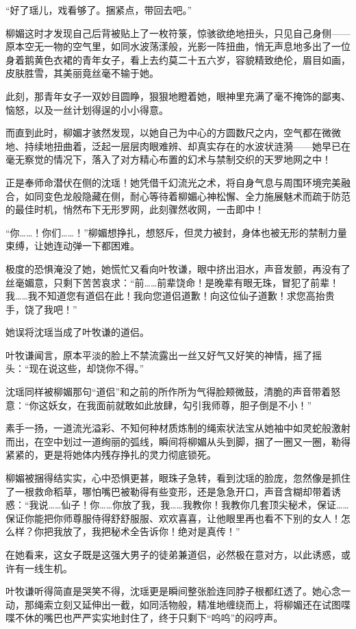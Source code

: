 “好了瑶儿，戏看够了。捆紧点，带回去吧。”

柳媚这时才发现自己后背被贴上了一枚符箓，惊骇欲绝地扭头，只见自己身侧——原本空无一物的空气里，如同水波荡漾般，光影一阵扭曲，悄无声息地多出了一位身着鹅黄色衣裙的青年女子，看上去约莫二十五六岁，容貌精致绝伦，眉目如画，皮肤胜雪，其美丽竟丝毫不输于她。

此刻，那青年女子一双妙目圆睁，狠狠地瞪着她，眼神里充满了毫不掩饰的鄙夷、恼怒，以及一丝计划得逞的小小得意。

而直到此时，柳媚才骇然发现，以她自己为中心的方圆数尺之内，空气都在微微地、持续地扭曲着，泛起一层层肉眼难辨、却真实存在的水波状涟漪——她早已在毫无察觉的情况下，落入了对方精心布置的幻术与禁制交织的天罗地网之中！

正是奉师命潜伏在侧的沈瑶！她凭借千幻流光之术，将自身气息与周围环境完美融合，如同变色龙般隐藏在侧，耐心等待着柳媚心神松懈、全力施展魅术而疏于防范的最佳时机，悄然布下无形罗网，此刻骤然收网，一击即中！

“你……！你们……！”柳媚想挣扎，想怒斥，但灵力被封，身体也被无形的禁制力量束缚，让她连动弹一下都困难。

极度的恐惧淹没了她，她慌忙又看向叶牧谦，眼中挤出泪水，声音发颤，再没有了丝毫媚意，只剩下苦苦哀求：“前……前辈饶命！是晚辈有眼无珠，冒犯了前辈！我……我不知道您有道侣在此！我向您道侣道歉！向这位仙子道歉！求您高抬贵手，饶了我吧！”

她误将沈瑶当成了叶牧谦的道侣。

叶牧谦闻言，原本平淡的脸上不禁流露出一丝又好气又好笑的神情，摇了摇头：“现在说这些，却饶你不得。”

沈瑶同样被柳媚那句“道侣”和之前的所作所为气得脸颊微鼓，清脆的声音带着怒意：“你这妖女，在我面前就敢如此放肆，勾引我师尊，胆子倒是不小！”

素手一扬，一道流光溢彩、不知何种材质炼制的绳索状法宝从她袖中如灵蛇般激射而出，在空中划过一道绚丽的弧线，瞬间将柳媚从头到脚，捆了一圈又一圈，勒得紧紧的，更是将她体内残存挣扎的灵力彻底锁死。

柳媚被捆得结实实，心中恐惧更甚，眼珠子急转，看到沈瑶的脸庞，忽然像是抓住了一根救命稻草，哪怕嘴巴被勒得有些变形，还是急急开口，声音含糊却带着诱惑：“我说……仙子！你……你放了我，我……我教你！我教你几套顶尖秘术，保证……保证你能把你师尊服侍得舒舒服服、欢欢喜喜，让他眼里再也看不下别的女人！怎么样？你把我放了，我把秘术全告诉你！绝对是真传！”

在她看来，这女子既是这强大男子的徒弟兼道侣，必然极在意对方，以此诱惑，或许有一线生机。

叶牧谦听得简直是哭笑不得，沈瑶更是瞬间整张脸连同脖子根都红透了。她心念一动，那绳索立刻又延伸出一截，如同活物般，精准地缠绕而上，将柳媚还在试图喋喋不休的嘴巴也严严实实地封住了，终于只剩下“呜呜”的闷哼声。

